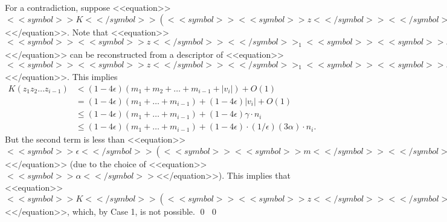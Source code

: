 \documentclass[proceedings]{stacs}
\begin{document}
For a contradiction, suppose <<equation>>$<<symbol>>K<</symbol>>(<<symbol>><<symbol>>z<</symbol>><</symbol>>_1 <<symbol>><<symbol>>z<</symbol>><</symbol>>_2 \ldots <<symbol>><<symbol>>z<</symbol>>_{<<symbol>>i<</symbol>><</symbol>>-1} <<symbol>><<symbol>>v<</symbol>>_<<symbol>>i<</symbol>><</symbol>>) < (1-4<<symbol>>\epsilon<</symbol>>) <<symbol>>|<<symbol>><<symbol>><</symbol>>z<</symbol>><</symbol>>_1 <<symbol>><<symbol>>z<</symbol>><</symbol>>_2 \ldots <<symbol>><<symbol>>z<</symbol>>_{<<symbol>>i<</symbol>><</symbol>>-1} <<symbol>><<symbol>>v<</symbol>>_<<symbol>>i<<symbol>><</symbol>><</symbol>>|<</symbol>>$<</equation>>.
Note that <<equation>>$<<symbol>><<symbol>>z<</symbol>><</symbol>>_1 <<symbol>><<symbol>>z<</symbol>><</symbol>>_2 \ldots <<symbol>><<symbol>>z<</symbol>>_{<<symbol>>i<</symbol>><</symbol>>-1}$<</equation>> can be reconstructed from a descriptor of <<equation>>$<<symbol>><<symbol>>z<</symbol>><</symbol>>_1 <<symbol>><<symbol>>z<</symbol>><</symbol>>_2 \ldots <<symbol>><<symbol>>z<</symbol>>_{<<symbol>>i<</symbol>><</symbol>>-1} <<symbol>><<symbol>>v<</symbol>>_<<symbol>>i<</symbol>><</symbol>>$<</equation>>.
This implies 
\[
\begin{array}{ll}
K(z_1 z_2 \ldots z_{i-1})  & < (1-4\epsilon)(m_1 + m_2 +\ldots + m_{i-1} + |v_i|) +O(1) \\
& =  (1-4 \epsilon) (m_1 + \ldots +m_{i-1}) + (1-4\epsilon)|v_i| + O(1) \\
& \leq (1-4 \epsilon) (m_1 + \ldots +m_{i-1}) + (1-4\epsilon)\gamma \cdot n_i \\
& \leq (1-4 \epsilon) (m_1 + \ldots +m_{i-1}) + (1-4\epsilon) \cdot (1/\epsilon) (3 \alpha) \cdot n_i.
\end{array}
\]
But the second term is less than <<equation>>$<<symbol>>\epsilon <</symbol>>(<<symbol>><<symbol>>m<</symbol>><</symbol>>_1 + \ldots + <<symbol>><<symbol>>m<</symbol>>_{<<symbol>>i<</symbol>><</symbol>>-1})$<</equation>> (due to the choice of <<equation>>$<<symbol>>\alpha<</symbol>>$<</equation>>). This implies that <<equation>>$<<symbol>>K<</symbol>>(<<symbol>><<symbol>>z<</symbol>><</symbol>>_1 <<symbol>><<symbol>>z<</symbol>><</symbol>>_2 \ldots <<symbol>><<symbol>>z<</symbol>>_{<<symbol>>i<</symbol>><</symbol>>-1}) \leq (1-3<<symbol>>\epsilon<</symbol>>) (<<symbol>><<symbol>>m<</symbol>><</symbol>>_1 + <<symbol>><<symbol>>m<</symbol>><</symbol>>_2 + \ldots + <<symbol>><<symbol>>m<</symbol>>_{<<symbol>>i<</symbol>><</symbol>>-1})$<</equation>>, which, by Case 1, is not possible.
\qed
\qed
\smallskip
\end{document}
